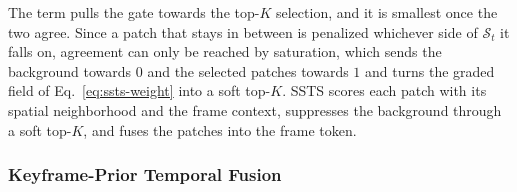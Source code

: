 \noindent The term pulls the gate towards the top-$K$ selection, and it is smallest once the two
agree.
Since a patch that stays in between is penalized whichever side of $\mathcal{S}_t$ it falls on,
agreement can only be reached by saturation, which sends the background towards $0$ and the selected
patches towards $1$ and turns the graded field of Eq.~\eqref{eq:ssts-weight} into a soft top-$K$.
SSTS scores each patch with its spatial neighborhood and the frame context, suppresses the background
through a soft top-$K$, and fuses the patches into the frame token.
\subsubsection{Keyframe-Prior Temporal Fusion}
\label{sec:method:video:temporal}


%


